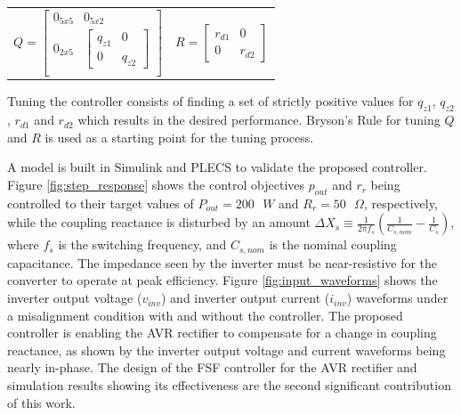 \documentclass[conference, twocolumn, letterpaper]{IEEEtran}
\begin{document}
\vspace{-0.6cm}
\renewcommand{\arraystretch}{1.25}
\begin{table}[ht]
\centering
\begin{tabular}{p{4.7cm}p{3cm}}
\begin{equation*}
Q = 
	\begin{bmatrix}
		0_{5x5} & 0_{5x2} \\
		0_{2x5} & \begin{bmatrix} q_{z1} & 0 \\ 0 & q_{z2} \end{bmatrix} \\
	\end{bmatrix}
\end{equation*}
&
\vspace{-0.1cm}
\begin{equation*}
R = 
	\begin{bmatrix}
		r_{d1} & 0 \\
		0 & r_{d2}
	\end{bmatrix}
\end{equation*}
\end{tabular}
\end{table}

\vspace{-0.5cm}

Tuning the controller consists of finding a set of strictly positive values for $q_{z1}$, $q_{z2}$, $r_{d1}$ and $r_{d2}$ which results in the desired performance. Bryson's Rule for tuning $Q$ and $R$ is used as a starting point for the tuning process.

A model is built in Simulink and PLECS to validate the proposed controller. Figure \ref{fig:step_response} shows the control objectives $p_{out}$ and $r_r$ being controlled to their target values of $P_{out} = 200 \texttt{ }W$ and $R_r = 50 \texttt{ }\Omega$, respectively, while the coupling reactance is disturbed by an amount $\Delta X_s \equiv \frac{1}{2 \pi f_s}(\frac{1}{C_{s,nom}} - \frac{1}{C_s})$, where $f_s$ is the switching frequency, and $C_{s,nom}$ is the nominal coupling capacitance. The impedance seen by the inverter must be near-resistive for the converter to operate at peak efficiency. Figure \ref{fig:input_waveforms} shows the inverter output voltage ($v_{inv}$) and inverter output current ($i_{inv}$) waveforms under a misalignment condition with and without the controller. The proposed controller is enabling the AVR rectifier to compensate for a change in coupling reactance, as shown by the inverter output voltage and current waveforms being nearly in-phase. The design of the FSF controller for the AVR rectifier and simulation results showing its effectiveness are the second significant contribution of this work.
\end{document}

